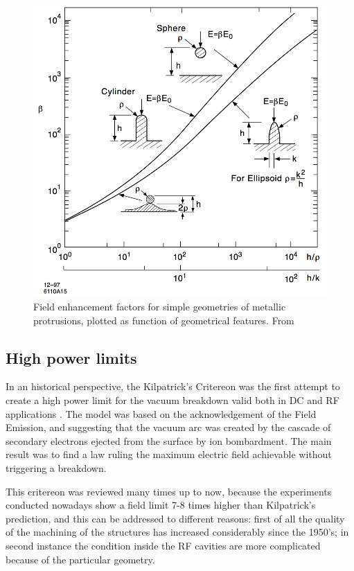 \begin{figure}[h]
\centering

\includegraphics[scale=0.3]{pictures/beta_tip_val}
\caption{Field enhancement factors for simple geometries of metallic protrusions, plotted as function of geometrical features. From \cite{Rohrbach:190223}}
\label{tip_factors}

\end{figure}






\subsection[High power limits]{High power limits}

In an historical perspective, the Kilpatrick's Critereon was the first attempt to create a high power limit for the vacuum breakdown valid both in DC and RF applications \cite{KilpLimit}. The model was based on the acknowledgement of the Field Emission, and suggesting that the vacuum arc was created by the cascade of secondary electrons ejected from the surface by ion bombardment. The main result was to find a law ruling the maximum electric field achievable without triggering a breakdown. 

This critereon was reviewed many times up to now, because the experiments conducted nowadays show a field limit 7-8 times higher than Kilpatrick's prediction, and this can be addressed to different reasons: first of all the quality of the machining of the structures has increased considerably since the 1950's; in second instance the condition inside the RF cavities are more complicated because of the particular geometry.

